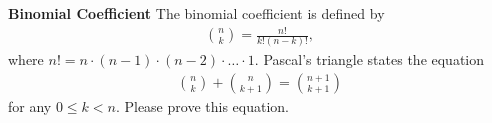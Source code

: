 \textbf{Binomial Coefficient}
The binomial coefficient is defined by
\begin{align*}
\binom{n}{k} = \frac{n!}{k!(n-k)!},
\end{align*}
where $n! = n\cdot(n-1)\cdot(n-2)\cdot\dots \cdot1$.
Pascal's triangle states the equation
\begin{align*}
\binom{n}{k} + \binom{n}{k+1} = \binom{n+1}{k+1}
\end{align*}
for any $0 \leq k < n$.
Please prove this equation.